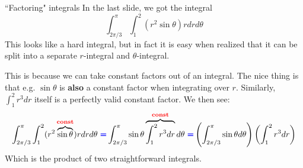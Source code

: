 \begin{frame}{``Factoring" integrals}\label{integraltrick}
    In the last slide, we got the integral \[\int_{2\pi/3}^{\pi}\int_{1}^2(r^2\sin\theta) rdrd\theta\] This looks like a hard integral, but in fact it is easy when realized that it can be split into a separate $r$-integral and $\theta$-integral.

    This is because we can take constant factors out of an integral. The nice thing is that e.g. $\sin\theta$ is \textbf{also} a constant factor when integrating over $r$. Similarly, $\int_1^2 r^3 dr$ itself is a perfectly valid constant factor. We then see:
    {\footnotesize
    \[\int_{2\pi/3}^{\pi}\int_{1}^2(r^2\overbrace{\sin\theta}^{\textcolor{red}{\textbf{const}}}) rdrd\theta \textcolor{blue}{~\pmb{=}} \int_{2\pi/3}^{\pi}\sin\theta\overbrace{\int_{1}^2r^3 dr}^{\textcolor{red}{\textbf{const}}}d\theta \textcolor{blue}{~\pmb{=}} \left(\int_{2\pi/3}^{\pi}\sin\theta d\theta\right)\left(\int_1^2r^3dr\right)\]}
    Which is the product of two straightforward integrals.
\end{frame}


